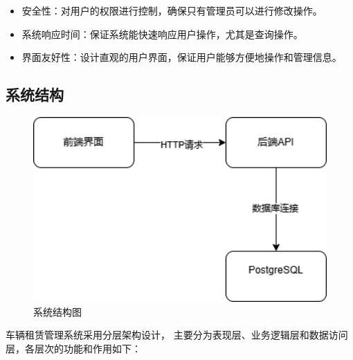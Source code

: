 \documentclass[UTF8,a4paper,12pt]{ctexart}
\begin{document}
\begin{itemize}
    \item 安全性：对用户的权限进行控制，确保只有管理员可以进行修改操作。
    \item 系统响应时间：保证系统能快速响应用户操作，尤其是查询操作。
    \item 界面友好性：设计直观的用户界面，保证用户能够方便地操作和管理信息。
\end{itemize}


\subsection{系统结构}

\begin{figure}[htbp]  %
    \centering  %
    \includegraphics[width=1\textwidth]{pic/sap.png}  %
    \caption{系统结构图}  %
    \label{fig:sap}  %
\end{figure}

车辆租赁管理系统采用分层架构设计，
主要分为表现层、业务逻辑层和数据访问层，各层次的功能和作用如下：
\end{document}
